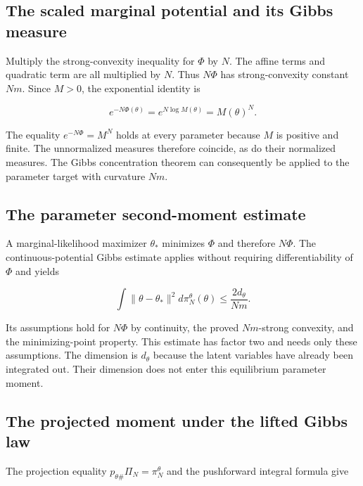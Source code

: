 \documentclass[11pt,a4paper]{article}
\begin{document}
\subsection{\texorpdfstring{The scaled marginal potential and its Gibbs measure}{The scaled marginal potential and its Gibbs measure}}


Multiply the strong-convexity inequality for \(\Phi\) by \(N\). The affine terms and quadratic term are all multiplied by \(N\). Thus \(N\Phi\) has strong-convexity constant \(Nm\). Since \(M>0\), the exponential identity is

\[e^{-N\Phi(\theta)}=e^{N\log M(\theta)}=M(\theta)^N.\]

The equality \(e^{-N\Phi}=M^N\) holds at every parameter because \(M\) is positive and finite. The unnormalized measures therefore coincide, as do their normalized measures. The Gibbs concentration theorem can consequently be applied to the parameter target with curvature \(Nm\).




\subsection{\texorpdfstring{The parameter second-moment estimate}{The parameter second-moment estimate}}


A marginal-likelihood maximizer \(\theta_*\) minimizes \(\Phi\) and therefore \(N\Phi\). The continuous-potential Gibbs estimate applies without requiring differentiability of \(\Phi\) and yields

\[\int\|\theta-\theta_*\|^2d\pi_N^\theta(\theta)\le\frac{2d_\theta}{Nm}.\]

Its assumptions hold for \(N\Phi\) by continuity, the proved \(Nm\)-strong convexity, and the minimizing-point property. This estimate has factor two and needs only these assumptions. The dimension is \(d_\theta\) because the latent variables have already been integrated out. Their dimension does not enter this equilibrium parameter moment.



\subsection{\texorpdfstring{The projected moment under the lifted Gibbs law}{The projected moment under the lifted Gibbs law}}


The projection equality \(p_{\theta\#}\Pi_N=\pi_N^\theta\) and the pushforward integral formula give
\end{document}
